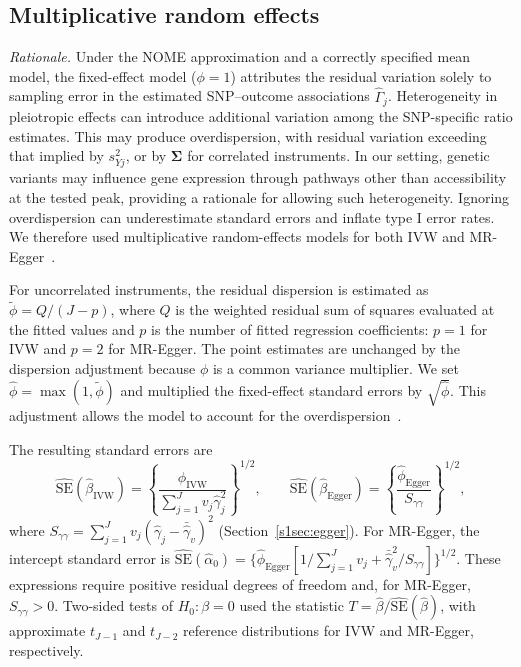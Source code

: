 \subsection*{Multiplicative random effects}
\label{s1sec:re}
\noindent \textit{Rationale.} Under the NOME approximation and a correctly specified mean model, the fixed-effect model ($\phi=1$) attributes the residual variation solely to sampling error in the estimated SNP--outcome associations $\hat{\Gamma}_j$. Heterogeneity in pleiotropic effects can introduce additional variation among the SNP-specific ratio estimates. This may produce overdispersion, with residual variation exceeding that implied by $s_{Yj}^{2}$, or by $\boldsymbol{\Sigma}$ for correlated instruments. In our setting, genetic variants may influence gene expression through pathways other than accessibility at the tested peak, providing a rationale for allowing such heterogeneity. Ignoring overdispersion can underestimate standard errors and inflate type I error rates. We therefore used multiplicative random-effects models for both IVW and MR-Egger~\cite{burgess2017interpreting}.

For uncorrelated instruments, the residual dispersion is estimated as $\widetilde{\phi}=Q/(J-p)$, where $Q$ is the weighted residual sum of squares evaluated at the fitted values and $p$ is the number of fitted regression coefficients: $p=1$ for IVW and $p=2$ for MR-Egger. The point estimates are unchanged by the dispersion adjustment because $\phi$ is a common variance multiplier. We set $\hat{\phi}=\max(1,\widetilde{\phi})$ and multiplied the fixed-effect standard errors by $\sqrt{\hat{\phi}}$. This adjustment allows the model to account for the overdispersion~\cite{burgess2017interpreting}.

\noindent The resulting standard errors are
\begin{equation*}
\widehat{\mathrm{SE}}(\hat{\beta}_{\text{IVW}})
=
\left\{
\frac{\hat{\phi}_{\text{IVW}}}
     {\sum_{j=1}^{J}v_j\hat{\gamma}_j^2}
\right\}^{1/2},
\qquad
\widehat{\mathrm{SE}}(\hat{\beta}_{\text{Egger}})
=
\left\{
\frac{\hat{\phi}_{\text{Egger}}}
     {S_{\gamma\gamma}}
\right\}^{1/2},
\end{equation*}
where $S_{\gamma\gamma}=\sum_{j=1}^{J}v_j(\hat{\gamma}_j-\bar{\hat{\gamma}}_v)^2$ (Section~\ref{s1sec:egger}). For MR-Egger, the intercept standard error is $\widehat{\mathrm{SE}}(\hat{\alpha}_0)=\{\hat{\phi}_{\text{Egger}}[1/\sum_{j=1}^{J}v_j+\bar{\hat{\gamma}}_v^2/S_{\gamma\gamma}]\}^{1/2}$. These expressions require positive residual degrees of freedom and, for MR-Egger, $S_{\gamma\gamma}>0$. Two-sided tests of $H_0:\beta=0$ used the statistic $T=\hat{\beta}/\widehat{\mathrm{SE}}(\hat{\beta})$, with approximate $t_{J-1}$ and $t_{J-2}$ reference distributions for IVW and MR-Egger, respectively.

